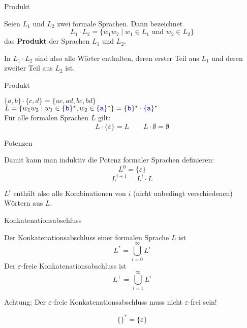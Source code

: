 \begin{frame}{Produkt}
		\begin{Definition}
			Seien $L_1$ und $L_2$ zwei formale Sprachen. Dann bezeichnet
				$$L_1 \cdot L_2 = \{w_1 w_2 \mid w_1 \in L_1 \text{ und } w_2 \in L_2 \}$$
				das \textbf{Produkt} der Sprachen $L_1$ und $L_2$.
		\end{Definition}
		\pause
		In $L_1 \cdot L_2$ sind also alle Wörter enthalten, deren erster Teil aus $L_1$ und deren zweiter Teil aus $L_2$ ist.
	
\end{frame}

\begin{frame}{Produkt}
	\begin{Beispiele}
		$\{a, b\} \cdot \{c, d\} = \{ac, ad, bc, bd\}$\\[0.3em]
		\pause
		$ L = \{w_1w_2 \mid w_1\in \{\literal{b}\}^* ,  w_2\in \{\literal{a}\}^* \} 
		= \{\literal{b}\}^* \cdot \{\literal{a}\}^* $\\[1em]
		\pause
		Für alle formalen Sprachen $L$ gilt:\\
		$$ L \cdot \{\varepsilon\} = L  \qquad L \cdot \emptyset = \emptyset$$
	\end{Beispiele}
\end{frame}

\begin{frame}{Potenzen}
	\begin{Definition}
	Damit kann man induktiv die Potenz formaler Sprachen definieren:
	$$L^0 = \{\varepsilon \}$$
	$$L^{i+1} = L^i \cdot L$$
	\end{Definition} \pause
	$L^i$ enthält also alle Kombinationen von $i$ (nicht unbedingt verschiedenen) Wörtern aus $L$.
\end{frame}

\begin{frame}{Konkatenationsabschluss}
	\begin{Definition}
		Der Konkatenationsabschluss einer formalen Sprache $L$ ist $$L^\ast = \bigcup \limits_{i=0}^\infty L^i$$ 
		\pause
		Der $\varepsilon$-freie Konkatenationsabschluss ist $$L^+ = \bigcup \limits_{i=1}^\infty L^i$$
	\end{Definition} \pause
	Achtung: Der $\varepsilon$-freie Konkatenationsabschluss muss nicht $\varepsilon$-frei sein! \pause
	
	$$ \{\}^* = \{\varepsilon\} $$
\end{frame}


